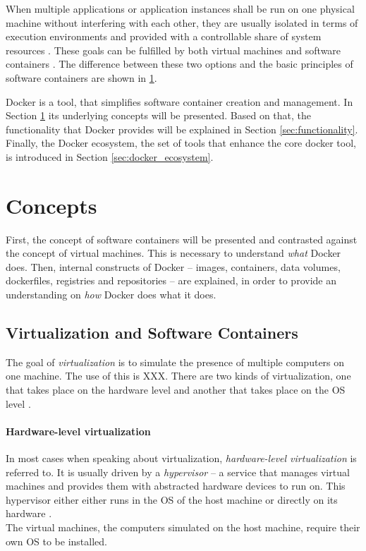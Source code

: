   When multiple applications or application instances shall be run on one physical machine without interfering with each other, they are usually isolated in terms of execution environments and provided with a controllable share of system resources \cite{Felter2014Updated}. These goals can be fulfilled by both virtual machines and software containers \cite{Ruiz2015Performance}. The difference between these two options and the basic principles of software containers are shown in \ref{sec:docker_concepts}.

  Docker is a tool, that simplifies software container creation and management. In Section \ref{sec:docker_concepts} its underlying concepts will be presented. Based on that, the functionality that Docker provides will be explained in Section \ref{sec:functionality}. Finally, the Docker ecosystem, \ie the set of tools that enhance the core docker tool, is introduced in Section \ref{sec:docker_ecosystem}.

\section{Concepts} %
\label{sec:docker_concepts}

  First, the concept of software containers will be presented and contrasted against the concept of virtual machines. This is necessary to understand \emph{what} Docker does. Then, internal constructs of Docker -- images, containers, data volumes, dockerfiles, registries and repositories -- are explained, in order to provide an understanding on \emph{how} Docker does what it does.

  \subsection{Virtualization and Software Containers} %
  \label{sub:virtualization_and_software_containers}
    The goal of \emph{virtualization} is to simulate the presence of multiple computers on one machine. The use of this is XXX. There are two kinds of virtualization, one that takes place on the hardware level and another that takes place on the \ac{OS} level \cite{Ruiz2015Performance}.

    \paragraph{Hardware-level virtualization} %
    \label{par:hardware_level_virtualization}
      In most cases when speaking about virtualization, \emph{hardware-level virtualization} is referred to. It is usually driven by a \emph{hypervisor} -- a service that manages virtual machines and provides them with abstracted hardware devices to run on. This hypervisor either either runs in the OS of the host machine or directly on its hardware \cite{Ruiz2015Performance}. \\
      The virtual machines, \ie the computers simulated on the host machine, require their own OS to be installed.

